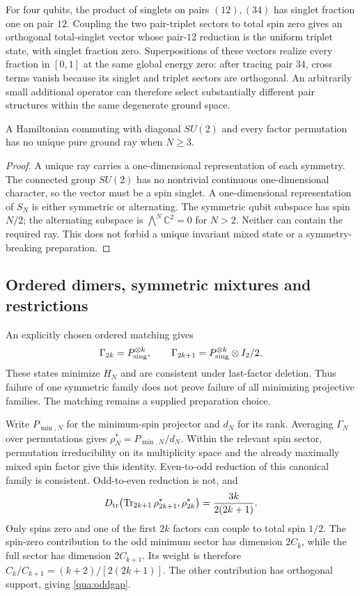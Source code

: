 For four qubits, the product of singlets on pairs $(12),(34)$ has singlet fraction one on pair $12$. Coupling the two pair-triplet sectors to total spin zero gives an orthogonal total-singlet vector whose pair-$12$ reduction is the uniform triplet state, with singlet fraction zero. Superpositions of these vectors realize every fraction in $[0,1]$ at the same global energy zero: after tracing pair $34$, cross terms vanish because its singlet and triplet sectors are orthogonal. An arbitrarily small additional operator can therefore select substantially different pair structures within the same degenerate ground space.

\begin{proposition}
A Hamiltonian commuting with diagonal $SU(2)$ and every factor permutation has no unique pure ground ray when $N\ge3$.
\end{proposition}
\begin{proof}
A unique ray carries a one-dimensional representation of each symmetry. The connected group $SU(2)$ has no nontrivial continuous one-dimensional character, so the vector must be a spin singlet. A one-dimensional representation of $S_N$ is either symmetric or alternating. The symmetric qubit subspace has spin $N/2$; the alternating subspace is $\bigwedge^N\mathbb C^2=0$ for $N>2$. Neither can contain the required ray. This does not forbid a unique invariant mixed state or a symmetry-breaking preparation.
\end{proof}

\subsection{Ordered dimers, symmetric mixtures and restrictions}
\label{qua:projective}
An explicitly chosen ordered matching gives
\[
 \Gamma_{2k}=P_{\rm sing}^{\otimes k},\qquad
 \Gamma_{2k+1}=P_{\rm sing}^{\otimes k}\otimes I_2/2.
\]
These states minimize $H_N$ and are consistent under last-factor deletion. Thus failure of one symmetric family does not prove failure of all minimizing projective families. The matching remains a supplied preparation choice.

Write $P_{\min,N}$ for the minimum-spin projector and $d_N$ for its rank. Averaging $\Gamma_N$ over permutations gives
$\rho_N^*=P_{\min,N}/d_N$.
Within the relevant spin sector, permutation irreducibility on its multiplicity space and the already maximally mixed spin factor give this identity. Even-to-odd reduction of this canonical family is consistent. Odd-to-even reduction is not, and
\begin{equation}
 D_{\rm tr}\bigl(\operatorname{Tr}_{2k+1}\rho_{2k+1}^*,\rho_{2k}^*\bigr)
 =\frac{3k}{2(2k+1)}.
 \label{qua:oddgap}
\end{equation}
Only spins zero and one of the first $2k$ factors can couple to total spin $1/2$. The spin-zero contribution to the odd minimum sector has dimension $2C_k$, while the full sector has dimension $2C_{k+1}$. Its weight is therefore $C_k/C_{k+1}=(k+2)/[2(2k+1)]$. The other contribution has orthogonal support, giving \eqref{qua:oddgap}.

